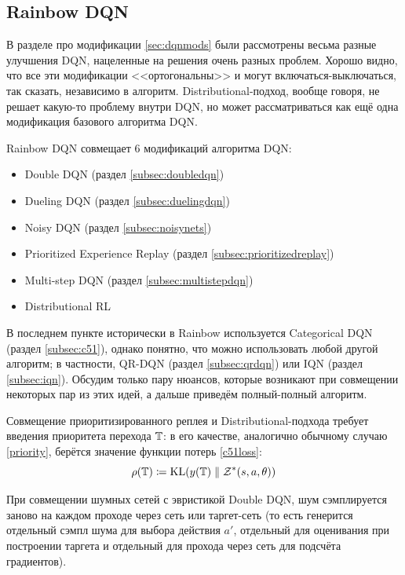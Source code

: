 \subsection{Rainbow DQN}\label{subsec:rainbow}

В разделе про модификации \ref{sec:dqnmods} были рассмотрены весьма разные улучшения DQN, нацеленные на решения очень разных проблем. Хорошо видно, что все эти модификации <<ортогональны>> и могут включаться-выключаться, так сказать, независимо в алгоритм. Distributional-подход, вообще говоря, не решает какую-то проблему внутри DQN, но может рассматриваться как ещё одна модификация базового алгоритма DQN.

Rainbow DQN совмещает 6 модификаций алгоритма DQN:
\begin{itemize}
    \item Double DQN (раздел \ref{subsec:doubledqn})
    \item Dueling DQN (раздел \ref{subsec:duelingdqn})
    \item Noisy DQN  (раздел \ref{subsec:noisynets})
    \item Prioritized Experience Replay (раздел \ref{subsec:prioritizedreplay})
    \item Multi-step DQN (раздел \ref{subsec:multistepdqn})
    \item Distributional RL
\end{itemize}

В последнем пункте исторически в Rainbow используется Categorical DQN (раздел \ref{subsec:c51}), однако понятно, что можно использовать любой другой алгоритм; в частности, QR-DQN (раздел \ref{subsec:qrdqn}) или IQN (раздел \ref{subsec:iqn}). Обсудим только пару нюансов, которые возникают при совмещении некоторых пар из этих идей, а дальше приведём полный-полный алгоритм.

Совмещение приоритизированного реплея и Distributional-подхода требует введения приоритета перехода $\mathbb{T}$: в его качестве, аналогично обычному случаю \eqref{priority}, берётся значение функции потерь \eqref{c51loss}: 
$$\rho(\mathbb{T}) \coloneqq \operatorname{KL}(y(\mathbb{T}) \parallel \mathcal{Z}^*(s, a, \theta))$$

При совмещении шумных сетей с эвристикой Double DQN, шум сэмплируется заново на каждом проходе через сеть или таргет-сеть (то есть генерится отдельный сэмпл шума для выбора действия $a'$, отдельный для оценивания при построении таргета и отдельный для прохода через сеть для подсчёта градиентов).

